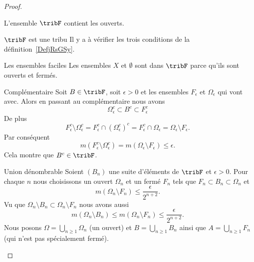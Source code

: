 \begin{proof}
\begin{subproof}
                L'ensemble \( \tribF\) contient les ouverts.

            \item[\( \tribF\) est une tribu]
                Il y a à vérifier les trois conditions de la définition~\ref{DefjRsGSy}.
                \begin{subproof}
                \item[Les ensembles faciles]
                    Les ensembles \( X\) et \( \emptyset\) sont dans \( \tribF\) parce qu'ils sont ouverts et fermés.
                \item[Complémentaire]
                    Soit \( B\in \tribF\), soit \( \epsilon>0\) et les ensembles \( F_{\epsilon} \) et \( \Omega_{\epsilon}\) qui vont avec. Alors en passant au complémentaire nous avons
                    \begin{equation}
                        \Omega_{\epsilon}^c\subset B^c\subset F_{\epsilon}^c
                    \end{equation}
                    De plus
                    \begin{equation}
                        F_{\epsilon}^c\setminus \Omega_{\epsilon}^c=F_{\epsilon}^c\cap(\Omega_{\epsilon}^c)^c=F_{\epsilon}^c\cap \Omega_{\epsilon}=\Omega_{\epsilon}\setminus F_{\epsilon}.
                    \end{equation}
                    Par conséquent
                    \begin{equation}
                        m(F_{\epsilon}^c\setminus \Omega_{\epsilon}^c)=m(\Omega_{\epsilon}\setminus F_{\epsilon})\leq \epsilon.
                    \end{equation}
                    Cela montre que \( B^c\in \tribF\).
                \item[Union dénombrable]
                    Soient \( (B_n)\) une suite d'éléments de \( \tribF\) et \( \epsilon>0\). Pour chaque \( n\) nous choisissons un ouvert \( \Omega_n\) et un fermé \( F_n\) tels que \( F_n\subset  B_n\subset \Omega_n\) et
                    \begin{equation}
                        m(\Omega_n\setminus F_n)\leq \frac{ \epsilon }{ 2^{n+2} }.
                    \end{equation}
                    Vu que \( \Omega_n\setminus B_n\subset \Omega_n\setminus F_n\) nous avons aussi
                    \begin{equation}
                        m(\Omega_n\setminus B_n)\leq m(\Omega_n\setminus F_n)\leq \frac{ \epsilon }{ 2^{n+2} }.
                    \end{equation}
                    Nous posons \( \Omega=\bigcup_{n\geq 1}\Omega_n\) (un ouvert) et \( B=\bigcup_{n\geq 1}B_n\) ainsi que \( A=\bigcup_{n\geq 1}F_n\) (qui n'est pas spécialement fermé).


\end{subproof}
\end{subproof}
\end{proof}
